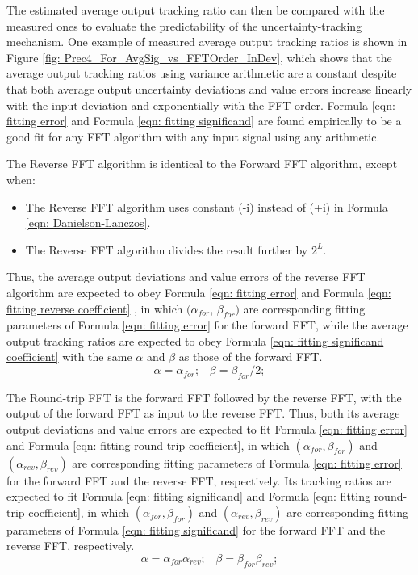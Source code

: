 \documentclass[twoside]{article}
\numberwithin{equation}{section}
\newcommand{\eqspace}{\;\;\;}
\begin{document}
The estimated average output tracking ratio can then be compared with the measured ones to evaluate the predictability of the uncertainty-tracking mechanism.  One example of measured average output tracking ratios is shown in Figure \ref{fig: Prec4_For_AvgSig_vs_FFTOrder_InDev}, which shows that the average output tracking ratios using variance arithmetic are a constant despite that both average output uncertainty deviations and value errors increase linearly with the input deviation and exponentially with the FFT order.  Formula \eqref{eqn: fitting error} and Formula \eqref{eqn: fitting significand} are found empirically to be a good fit for any FFT algorithm with any input signal using any arithmetic.

The Reverse FFT algorithm is identical to the Forward FFT algorithm, except when:

\begin{itemize}
\item  The Reverse FFT algorithm uses constant (-i) instead of (+i) in Formula \eqref{eqn: Danielson-Lanczos}.

\item  The Reverse FFT algorithm divides the result further by $2^{L}$.  
\end{itemize}
Thus, the average output deviations and value errors of the reverse FFT algorithm are expected to obey Formula \eqref{eqn: fitting error} and Formula \eqref{eqn: fitting reverse coefficient} , in which $(\alpha_{for}$, $\beta_{for})$ are corresponding fitting parameters of Formula \eqref{eqn: fitting error} for the forward FFT, while the average output tracking ratios are expected to obey Formula \eqref{eqn: fitting significand coefficient} with the same $\alpha$ and $\beta$ as those of the forward FFT.  
\begin{equation}
\label{eqn: fitting reverse coefficient} 
\alpha = \alpha _{for}; \eqspace  \beta = \beta _{for}/2;
\end{equation}

The Round-trip FFT is the forward FFT followed by the reverse FFT, with the output of the forward FFT as input to the reverse FFT.  Thus, both its average output deviations and value errors are expected to fit Formula \eqref{eqn: fitting error} and Formula \eqref{eqn: fitting round-trip coefficient}, in which $(\alpha _{for}, \beta _{for})$ and $(\alpha _{rev}, \beta _{rev})$ are corresponding fitting parameters of Formula \eqref{eqn: fitting error} for the forward FFT and the reverse FFT, respectively.  Its tracking ratios are expected to fit Formula \eqref{eqn: fitting significand} and Formula \eqref{eqn: fitting round-trip coefficient}, in which $(\alpha _{for}, \beta _{for})$ and $(\alpha _{rev}, \beta _{rev})$ are corresponding fitting parameters of Formula \eqref{eqn: fitting significand} for the forward FFT and the reverse FFT, respectively.
\begin{equation}
\label{eqn: fitting round-trip coefficient} 
\alpha = \alpha _{for} \alpha _{rev}; \eqspace \beta = \beta _{for} \beta _{rev};
\end{equation}
\end{document}
